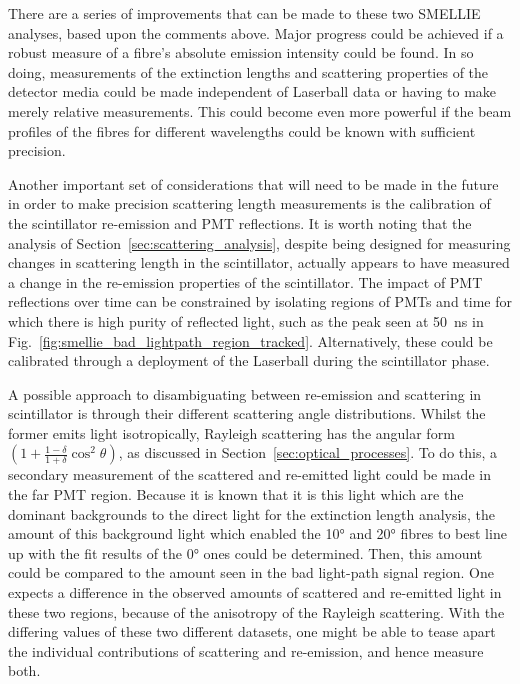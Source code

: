 There are a series of improvements that can be made to these two SMELLIE analyses, based upon the comments above. Major progress could be achieved if a robust measure of a fibre's absolute emission intensity could be found. In so doing, measurements of the extinction lengths and scattering properties of the detector media could be made independent of Laserball data or having to make merely relative measurements. This could become even more powerful if the beam profiles of the fibres for different wavelengths could be known with sufficient precision.

Another important set of considerations that will need to be made in the future in order to make precision scattering length measurements is the calibration of the scintillator re-emission and PMT reflections. It is worth noting that the analysis of Section~\ref{sec:scattering_analysis}, despite being designed for measuring changes in scattering length in the scintillator, actually appears to have measured a change in the re-emission properties of the scintillator. The impact of PMT reflections over time can be constrained by isolating regions of PMTs and time for which there is high purity of reflected light, such as the peak seen at \SI{50}{\ns} in Fig.~\ref{fig:smellie_bad_lightpath_region_tracked}. Alternatively, these could be calibrated through a deployment of the Laserball during the scintillator phase.

A possible approach to disambiguating between re-emission and scattering in scintillator is through their different scattering angle distributions. Whilst the former emits light isotropically, Rayleigh scattering has the angular form $\left(1+\frac{1-\delta}{1+\delta}\cos^{2}\theta\right)$, as discussed in Section~\ref{sec:optical_processes}. To do this, a secondary measurement of the scattered and re-emitted light could be made in the far PMT region. Because it is known that it is this light which are the dominant backgrounds to the direct light for the extinction length analysis, the amount of this background light which enabled the \ang{10} and \ang{20} fibres to best line up with the fit results of the \ang{0} ones could be determined. Then, this amount could be compared to the amount seen in the bad light-path signal region. One expects a difference in the observed amounts of scattered and re-emitted light in these two regions, because of the anisotropy of the Rayleigh scattering. With the differing values of these two different datasets, one might be able to tease apart the individual contributions of scattering and re-emission, and hence measure both.


